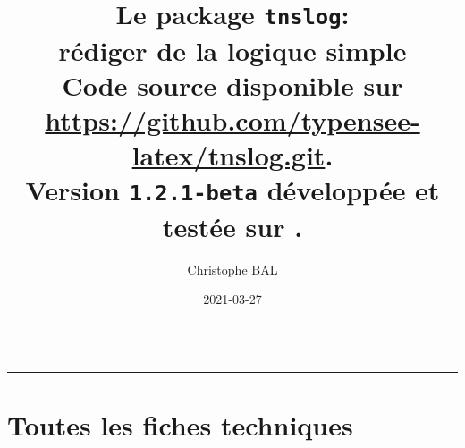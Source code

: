 \documentclass[12pt,a4paper]{article}
\begin{document}
\renewcommand\labelitemi{\raisebox{0.125em}{\tiny\textbullet}}
\renewcommand{\labelitemii}{---}

\title{  %
	Le package \texttt{tnslog}:\\%
	rédiger de la logique simple\\%
	{\footnotesize Code source disponible sur \url{https://github.com/typensee-latex/tnslog.git}.}\\%
{\footnotesize Version \texttt{1.2.1-beta} développée et testée sur \macosxname{}.}%
}
\author{Christophe BAL}
\date{2021-03-27}

\maketitle


\vspace{2em}

\hrule

\tableofcontents

\vspace{1.5em}

\hrule

\newpage



\newpage
\section{Toutes les fiches techniques} \label{techincal-ids}

\end{document}
